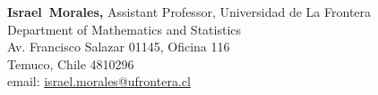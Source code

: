 \documentclass[margin,line]{res}
\begin{document}
\begin{resume}
\parbox{\textwidth}{%
{\bf Israel~Morales,} Assistant Professor, Universidad de La Frontera \\
Department of Mathematics and Statistics \\
Av. Francisco Salazar 01145, Oficina 116 \\
Temuco, Chile 4810296 \\
email: \href{mailto:israel.morales@ufrontera.cl}{israel.morales@ufrontera.cl} \\
}
\par


\end{resume}
\end{document}
